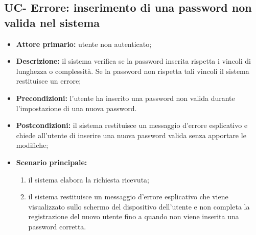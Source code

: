 \subsection{UC- Errore: inserimento di una password non valida nel sistema}
\begin{itemize}
	\item \textbf{Attore primario:} utente non autenticato;

	\item \textbf{Descrizione:} il sistema verifica se la password inserita rispetta i vincoli di lunghezza o complessità. Se la password non rispetta tali vincoli il sistema restituisce un errore;

	\item \textbf{Precondizioni:} l'utente ha inserito una password non valida durante l'impostazione di una nuova password.

	\item \textbf{Postcondizioni:} il sistema restituisce un messaggio d'errore esplicativo e chiede all'utente di inserire una nuova password valida senza apportare le modifiche;

	\item \textbf{Scenario principale:}
	      \begin{enumerate}
		      \item il sistema elabora la richiesta ricevuta;
		      \item il sistema restituisce un messaggio d'errore esplicativo che viene visualizzato sullo schermo del dispositivo dell'utente e non completa la registrazione del nuovo utente fino a quando non viene inserita una password corretta.
	      \end{enumerate}
\end{itemize}

